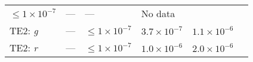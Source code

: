 \documentclass[DM, lsstdraft, toc]{lsstdoc}
\begin{document}
\begin{longtable}[]{@{}llllll@{}}
\begin{minipage}[t]{0.14\columnwidth}
\(\leq 1\times10^{-7}\)\strut
\end{minipage} & \begin{minipage}[t]{0.12\columnwidth}\raggedright\strut
---\strut
\end{minipage} & \begin{minipage}[t]{0.12\columnwidth}\raggedright\strut
---\strut
\end{minipage} & \begin{minipage}[t]{0.17\columnwidth}\raggedright\strut
No data\strut
\end{minipage}\tabularnewline
\begin{minipage}[t]{0.12\columnwidth}\raggedright\strut
TE2: \emph{g}\strut
\end{minipage} & \begin{minipage}[t]{0.06\columnwidth}\raggedright\strut
---\strut
\end{minipage} & \begin{minipage}[t]{0.14\columnwidth}\raggedright\strut
\(\leq 1\times10^{-7}\)\strut
\end{minipage} & \begin{minipage}[t]{0.12\columnwidth}\raggedright\strut
\(3.7\times10^{-7}\)\strut
\end{minipage} & \begin{minipage}[t]{0.12\columnwidth}\raggedright\strut
\(1.1\times10^{-6}\)\strut
\end{minipage} & \begin{minipage}[t]{0.17\columnwidth}\raggedright\strut
\strut
\end{minipage}\tabularnewline
\begin{minipage}[t]{0.12\columnwidth}\raggedright\strut
TE2: \emph{r}\strut
\end{minipage} & \begin{minipage}[t]{0.06\columnwidth}\raggedright\strut
---\strut
\end{minipage} & \begin{minipage}[t]{0.14\columnwidth}\raggedright\strut
\(\leq 1\times10^{-7}\)\strut
\end{minipage} & \begin{minipage}[t]{0.12\columnwidth}\raggedright\strut
\(1.0\times10^{-6}\)\strut
\end{minipage} & \begin{minipage}[t]{0.12\columnwidth}\raggedright\strut
\(2.0\times10^{-6}\)\strut
\end{minipage} & \begin{minipage}[t]{0.17\columnwidth}\raggedright\strut

\end{minipage}
\end{longtable}
\end{document}
